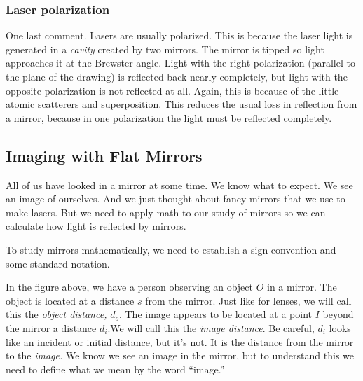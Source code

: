 \documentclass{article}
\begin{document}
\subsubsection{Laser polarization}

One last comment. Lasers are usually polarized. This is because the laser
light is generated in a \emph{cavity} created by two mirrors. The mirror is
tipped so light approaches it at the Brewster angle. Light with the right
polarization (parallel to the plane of the drawing) is reflected back nearly
completely, but light with the opposite polarization is not reflected at
all. Again, this is because of the little atomic scatterers and
superposition. This reduces the usual loss in reflection from a mirror,
because in one polarization the light must be reflected completely.


\subsection{Imaging with Flat Mirrors}

All of us have looked in a mirror at some time. We know what to expect. We
see an image of ourselves. And we just thought about fancy mirrors that we
use to make lasers. But we need to apply math to our study of mirrors so we
can calculate how light is reflected by mirrors.

To study mirrors mathematically, we need to establish a sign convention and
some standard notation.

In the figure above, we have a
person observing an object $O$ in a mirror. The object is located at a
distance $s$ from the mirror. Just like for lenses, we will call this the 
\emph{object distance, }$d_{o}$. The image appears to be located at a point $%
I$ beyond the mirror a distance $d_{i}.$We will call this the \emph{image
distance}. Be careful, $d_{i}$ looks like an incident or initial distance,
but it's not. It is the distance from the mirror to the \emph{image.} We
know we see an image in the mirror, but to understand this we need to define
what we mean by the word \textquotedblleft image.\textquotedblright
\end{document}
